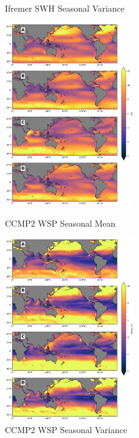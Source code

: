 \documentclass[draft,linenumbers]{agujournal2018}
\begin{document}
\begin{figure}[tbh]
\begin{minipage}{.5\textwidth}
    \caption{Ifremer SWH Seasonal Variance}
    \label{Ifremer_swh_seasonal_var}
\end{minipage}
\label{Ifremer_swh_seasonal_pro}
\end{figure}

\begin{figure}[tbh]
  \begin{minipage}{.5\textwidth}
    \centering
    \includegraphics[width=0.5\textwidth]{figs/statistical_moments/CCMP2_seasonal_mean_wsp.png}
    \caption{CCMP2 WSP Seasonal Mean}
    \label{CCMP2_wsp_seasonal_mean}
  \end{minipage}
  \begin{minipage}{.5\textwidth}
    \centering
    \includegraphics[width=0.5\textwidth]{figs/statistical_moments/CCMP2_seasonal_var_wsp.png}
    \caption{CCMP2 WSP Seasonal Variance}
    \label{CCMP2_wsp_seasonal_var}
  \end{minipage}
\label{ccmp2_wsp_seasonal_pro}
\end{figure}
\end{document}
